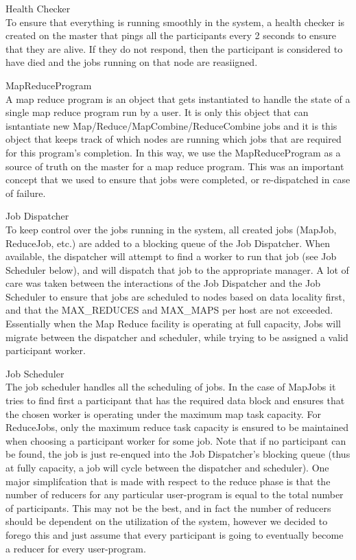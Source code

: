 \documentclass[11pt]{article}
\begin{document}
Health Checker
\\ To ensure that everything is running smoothly in the system, a health checker is created on the master that pings all the participants every 2 seconds to ensure that they are alive. If they do not respond, then the participant is considered to have died and the jobs running on that node are reasiigned. 

MapReduceProgram
\\ A map reduce program is an object that gets instantiated to handle the state of a single map reduce program run by a user. It is only this object that can isntantiate new Map/Reduce/MapCombine/ReduceCombine jobs and it is this object that keeps track of which nodes are running which jobs that are required for this program's completion. In this way, we use the MapReduceProgram as a source of truth on the master for a map reduce program. This was an important concept that we used to ensure that jobs were completed, or re-dispatched in case of failure.

Job Dispatcher
\\ To keep control over the jobs running in the system, all created jobs (MapJob, ReduceJob, etc.) are added to a blocking queue of the Job Dispatcher. When available, the dispatcher will attempt to find a worker to run that job (see Job Scheduler below), and will dispatch that job to the appropriate manager. A lot of care was taken between the interactions of the Job Dispatcher and the Job Scheduler to ensure that jobs are scheduled to nodes based on data locality first, and that the MAX_REDUCES and MAX_MAPS per host are not exceeded. Essentially when the Map Reduce facility is operating at full capacity, Jobs will migrate between the dispatcher and scheduler, while trying to be assigned a valid participant worker.

Job Scheduler
\\ The job scheduler handles all the scheduling of jobs. In the case of MapJobs it tries to find first a participant that has the required data block and ensures that the chosen worker is operating under the maximum map task capacity. For ReduceJobs, only the maximum reduce task capacity is ensured to be maintained when choosing a participant worker for some job. Note that if no participant can be found, the job is just re-enqued into the Job Dispatcher's blocking queue (thus at fully capacity, a job will cycle between the dispatcher and scheduler). One major simplifcation that is made with respect to the reduce phase is that the number of reducers for any particular user-program is equal to the total number of participants. This may not be the best, and in fact the number of reducers should be dependent on the utilization of the system, however we decided to forego this and just assume that every participant is going to eventually become a reducer for every user-program.
\end{document}
